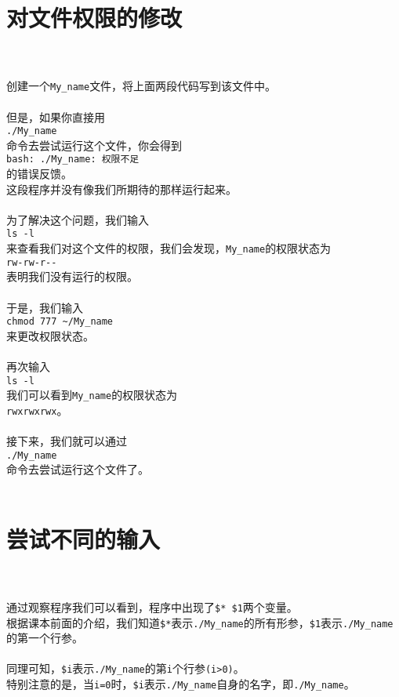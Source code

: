 \documentclass{ctexart}
\begin{document}
\section{对文件权限的修改}
~\\  
\\创建一个\verb|My_name|文件，将上面两段代码写到该文件中。
~\\  
\\但是，如果你直接用
\\\verb|./My_name|
\\命令去尝试运行这个文件，你会得到
\\\verb|bash: ./My_name: 权限不足|
\\的错误反馈。
\\这段程序并没有像我们所期待的那样运行起来。
~\\  
\\为了解决这个问题，我们输入
\\\verb|ls -l|
\\来查看我们对这个文件的权限，我们会发现，\verb|My_name|的权限状态为
\\\verb|rw-rw-r--|
\\表明我们没有运行的权限。
~\\  
\\于是，我们输入
\\\verb|chmod 777 ~/My_name|
\\来更改权限状态。
~\\  
\\再次输入
~\\\verb|ls -l|
\\我们可以看到\verb|My_name|的权限状态为
\\\verb|rwxrwxrwx|。
~\\  
\\接下来，我们就可以通过
\\\verb|./My_name|
\\命令去尝试运行这个文件了。
~\\
~\\

\section{尝试不同的输入}
~\\
\\通过观察程序我们可以看到，程序中出现了\verb|$* $1|两个变量。
\\根据课本前面的介绍，我们知道\verb|$*|表示\verb|./My_name|的所有形参，\verb|$1|表示\verb|./My_name|的第一个行参。
~\\
\\同理可知，\verb|$i|表示\verb|./My_name|的第\verb|i|个行参\verb|(i>0)|。
\\特别注意的是，当\verb|i=0|时，\verb|$i|表示\verb|./My_name|自身的名字，即\verb|./My_name|。\par
~\\
\end{document}
